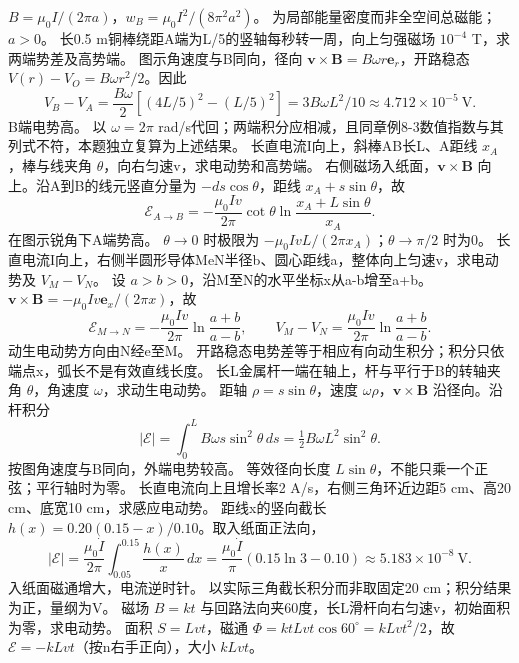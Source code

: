 \workings $B=\mu_0I/(2\pi a)$，$w_B=\mu_0 I^2/(8\pi^2a^2)$。
\crosscheck 为局部能量密度而非全空间总磁能；$a>0$。
\problemtext 长0.5 m铜棒绕距A端为L/5的竖轴每秒转一周，向上匀强磁场 $10^{-4}$ T，求两端势差及高势端。
\workings 图示角速度与B同向，径向 $\bm v\times\bm B=B\omega r\bm e_r$，开路稳态 $V(r)-V_O=B\omega r^2/2$。因此
\[
V_B-V_A=\frac{B\omega}{2}[(4L/5)^2-(L/5)^2]=3B\omega L^2/10
\approx4.712\times10^{-5}\ \mathrm V .
\]
B端电势高。
\crosscheck 以 $\omega=2\pi$ rad/s代回；两端积分应相减，且同章例8-3数值指数与其列式不符，本题独立复算为上述结果。
\problemtext 长直电流I向上，斜棒AB长L、A距线 $x_A$，棒与线夹角 $\theta$，向右匀速v，求电动势和高势端。
\workings 右侧磁场入纸面，$\bm v\times\bm B$ 向上。沿A到B的线元竖直分量为 $-ds\cos\theta$，距线 $x_A+s\sin\theta$，故
\[
\mathcal E_{A\to B}=-\frac{\mu_0Iv}{2\pi}\cot\theta\ln\frac{x_A+L\sin\theta}{x_A}.
\]
在图示锐角下A端势高。
\crosscheck $\theta\to0$ 时极限为 $-\mu_0IvL/(2\pi x_A)$；$\theta\to\pi/2$ 时为0。
\problemtext 长直电流I向上，右侧半圆形导体MeN半径b、圆心距线a，整体向上匀速v，求电动势及 $V_M-V_N$。
\workings 设 $a>b>0$，沿M至N的水平坐标x从a-b增至a+b。$\bm v\times\bm B=-\mu_0Iv\bm e_x/(2\pi x)$，故
\[
\mathcal E_{M\to N}=-\frac{\mu_0Iv}{2\pi}\ln\frac{a+b}{a-b},\qquad
V_M-V_N=\frac{\mu_0Iv}{2\pi}\ln\frac{a+b}{a-b}.
\]
动生电动势方向由N经e至M。
\crosscheck 开路稳态电势差等于相应有向动生积分；积分只依端点x，弧长不是有效直线长度。
\problemtext 长L金属杆一端在轴上，杆与平行于B的转轴夹角 $\theta$，角速度 $\omega$，求动生电动势。
\workings 距轴 $\rho=s\sin\theta$，速度 $\omega\rho$，$\bm v\times\bm B$ 沿径向。沿杆积分
\[
|\mathcal E|=\int_0^L B\omega s\sin^2\theta\,ds=\tfrac12B\omega L^2\sin^2\theta .
\]
按图角速度与B同向，外端电势较高。
\crosscheck 等效径向长度 $L\sin\theta$，不能只乘一个正弦；平行轴时为零。
\problemtext 长直电流向上且增长率2 A/s，右侧三角环近边距5 cm、高20 cm、底宽10 cm，求感应电动势。
\workings 距线x的竖向截长 $h(x)=0.20(0.15-x)/0.10$。取入纸面正法向，
\[
|\mathcal E|=\frac{\mu_0\dot I}{2\pi}\int_{0.05}^{0.15}\frac{h(x)}x\,dx
=\frac{\mu_0\dot I}{\pi}(0.15\ln3-0.10)
\approx5.183\times10^{-8}\ \mathrm V.
\]
入纸面磁通增大，电流逆时针。
\crosscheck 以实际三角截长积分而非取固定20 cm；积分结果为正，量纲为V。
\problemtext 磁场 $B=kt$ 与回路法向夹60度，长L滑杆向右匀速v，初始面积为零，求电动势。
\workings 面积 $S=Lvt$，磁通 $\Phi=ktLvt\cos60^\circ=kLvt^2/2$，故 $\mathcal E=-kLvt$（按n右手正向），大小 $kLvt$。
